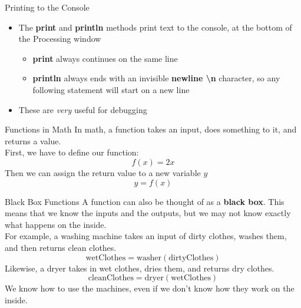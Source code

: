 \documentclass[pdf]{beamer}
\begin{document}
\begin{frame}{Printing to the Console}
\begin{itemize}
\item The \textbf{print} and \textbf{println} methods print text to the console, at the bottom of the Processing window
    \begin{itemize}
    \item \textbf{print} always continues on the same line
    \item \textbf{println} always ends with an invisible \textbf{newline \textbackslash n} character, so any following statement will start on a new line
    \end{itemize}
\item These are \textit{very} useful for debugging
\end{itemize}
\end{frame}

\begin{frame}{Functions in Math}
In math, a function takes an input, does something to it, and returns a value.\\
First, we have to define our function:
$$f(x) = 2x$$
Then we can assign the return value to a new variable $y$
$$y = f(x)$$
\end{frame}

\begin{frame}{Black Box Functions}
A function can also be thought of as a \textbf{black box}. This means that we know the inputs and the outputs, but we may not know exactly what happens on the inside.\\
For example, a washing machine takes an input of dirty clothes, washes them, and then returns clean clothes.
$$ \text{wetClothes} = \text{washer}(\text{dirtyClothes})$$
Likewise, a dryer takes in wet clothes, dries them, and returns dry clothes.
$$ \text{cleanClothes} = \text{dryer}(\text{wetClothes})$$
We know how to use the machines, even if we don't know how they work on the inside.
\end{frame}
\end{document}
